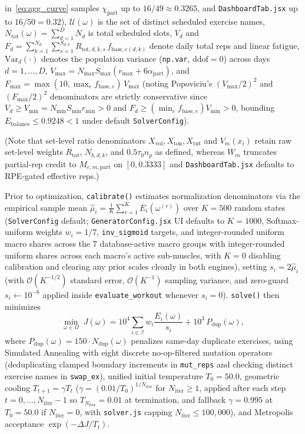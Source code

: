 \documentclass[10pt,twocolumn,letterpaper]{article}
\theoremstyle{plain}
\theoremstyle{definition}
\begin{document}
in~\eqref{eq:agg_curve} samples $\chi_{\mathrm{part}}$ up to $16/49 \approx 0.3265$, and \texttt{DashboardTab.jsx} up to $16/50 = 0.32$), $\mathcal{U}(\omega)$ is the set of distinct scheduled exercise names, $N_{\mathrm{tot}}(\omega) = \sum_{d=1}^D N_d$ is total scheduled slots, $V_d$ and $F_d = \sum_{k=1}^{N_d} \sum_{s=1}^{S_{d,k}} R_{\mathrm{tot},d,k,s}\, f_{\mathrm{base},e(d,k)}$ denote daily total reps and linear fatigue, $\mathrm{Var}_d(\cdot)$ denotes the population variance (\texttt{np.var}, $\mathrm{ddof}=0$) across days $d = 1,\dots,D$, $V_{\max} = N_{\max} S_{\max} (r_{\max} + 6 \alpha_{\mathrm{part}})$, and $F_{\max} = \max(10, \max_e f_{\mathrm{base},e})\,V_{\max}$ (noting Popoviciu's $(V_{\max}/2)^2$ and $(F_{\max}/2)^2$ denominators are strictly conservative since $V_d \ge V_{\min} = N_{\min} S_{\min} r_{\min} > 0$ and $F_d \ge (\min_e f_{\mathrm{base},e}) V_{\min} > 0$, bounding $E_{\mathrm{balance}} \le 0.9248 < 1$ under default \texttt{SolverConfig}).

\noindent (Note that set-level ratio denominators $X_{\mathrm{vol}}, X_{\mathrm{ton}}, X_{\mathrm{tut}}$ and $V_m(x_i)$ retain raw set-level weights $R_{\mathrm{tot}}$, $N_{b,d,k}$, and $0.5\tau_0 n_p$ as defined, whereas $W_m$ truncates partial-rep credit to $M_{e,m,\mathrm{part}}$ on $[0, 0.3333]$ and \texttt{DashboardTab.jsx} defaults to RPE-gated effective reps.)

Prior to optimization, \texttt{calibrate()} estimates normalization denominators via the empirical sample mean $\hat{\mu}_i = \frac{1}{K}\sum_{r=1}^{K} E_i(\omega^{(r)})$ over $K = 500$ random states (\texttt{SolverConfig} default; \texttt{GeneratorConfig.jsx} UI defaults to $K = 1000$, Softmax-uniform weights $w_i = 1/7$, \texttt{inv\_sigmoid} targets, and integer-rounded uniform macro shares across the $7$ database-active macro groups with integer-rounded uniform shares across each macro's active sub-muscles, with $K=0$ disabling calibration and clearing any prior scales cleanly in both engines), setting $s_i = 2 \hat{\mu}_i$ (with $\mathcal{O}(K^{-1/2})$ standard error, $\mathcal{O}(K^{-1})$ sampling variance, and zero-guard $s_i \leftarrow 10^{-6}$ applied inside \texttt{evaluate\_workout} whenever $s_i = 0$). \texttt{solve()} then minimizes
\begin{equation}
  \min_{\omega \in \Omega}\; J(\omega) = 10^4 \sum_{i \in \mathcal{I}} w_i \frac{E_i(\omega)}{s_i} + 10^3 \, P_{\mathrm{dup}}(\omega),
\end{equation}
where $P_{\mathrm{dup}}(\omega) = 150 \cdot N_{\mathrm{dup}}(\omega)$ penalizes same-day duplicate exercises, using Simulated Annealing with eight discrete no-op-filtered mutation operators (deduplicating clamped boundary increments in \texttt{mut\_reps} and checking distinct exercise names in \texttt{swap\_ex}), unified initial temperature $T_0 = 50.0$, geometric cooling $T_{t+1} = \gamma T_t$ ($\gamma = (0.01 / T_0)^{1/N_{\mathrm{iter}}}$ for $N_{\mathrm{iter}} \ge 1$, applied after each step $t = 0, \dots, N_{\mathrm{iter}}-1$ so $T_{N_{\mathrm{iter}}} = 0.01$ at termination, and fallback $\gamma = 0.995$ at $T_0 = 50.0$ if $N_{\mathrm{iter}} = 0$, with \texttt{solver.js} capping $N_{\mathrm{iter}} \le 100{,}000$), and Metropolis acceptance $\exp(-\Delta J / T_t)$.
\end{document}
